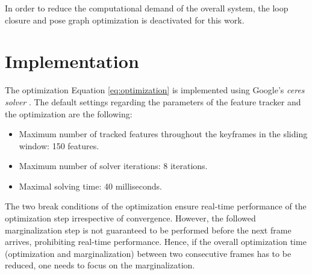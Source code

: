 In order to reduce the computational demand of the overall system, the 
loop closure and pose graph optimization is deactivated for this work.

\section{Implementation} \label{sec:implementation}
The optimization Equation \eqref{eq:optimization} is implemented using Google's 
\textit{ceres solver} \citep{ceres-solver}. The default settings regarding the 
parameters of the feature tracker and the optimization are the following:
\begin{itemize} 
 \item Maximum number of tracked features throughout the keyframes in the 
sliding window: 150 features.
 \item Maximum number of solver iterations: 8 iterations.
 \item Maximal solving time: 40 milliseconds.
\end{itemize}
The two break conditions of the optimization ensure real-time 
performance of the optimization step irrespective of 
convergence. However, the followed marginalization step is not guaranteed to be
performed before the next frame arrives, prohibiting real-time performance. 
Hence, if the overall optimization time (optimization and marginalization) 
between two consecutive frames has to be reduced, one needs to focus on the 
marginalization. 